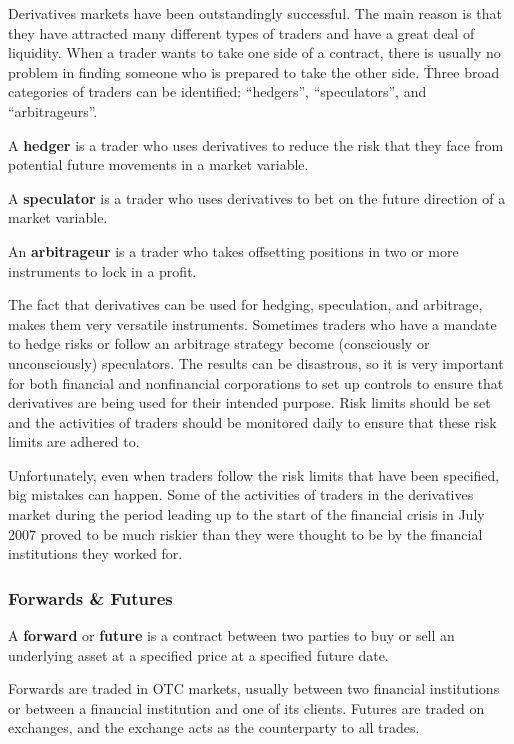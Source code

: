 Derivatives markets have been outstandingly successful. The main reason is that they have attracted many different
types of traders and have a great deal of liquidity. When a trader wants to take one side of a contract,
there is usually no problem in finding someone who is prepared to take the other side. \v

Three broad categories of traders can be identified: ``hedgers'', ``speculators'', and ``arbitrageurs''.

\bd[Hedger]
A \textbf{hedger} is a trader who uses derivatives to reduce the risk that they face from potential future movements in
a market variable.
\ed

\bd[Speculator]
A \textbf{speculator} is a trader who uses derivatives to bet on the future direction of a market variable.
\ed

\bd[Arbitrageur]
An \textbf{arbitrageur} is a trader who takes offsetting positions in two or more instruments to lock in a profit.
\ed

The fact that derivatives can be used for hedging, speculation, and arbitrage, makes them very versatile instruments.
Sometimes traders who have a mandate to hedge risks or follow an arbitrage strategy become (consciously or
unconsciously) speculators. The results can be disastrous, so it is very important for both financial and
nonfinancial corporations to set up controls to ensure that derivatives are being used for their intended purpose.
Risk limits should be set and the activities of traders should be monitored daily to ensure that these risk limits
are adhered to.

Unfortunately, even when traders follow the risk limits that have been specified, big mistakes can happen. Some of
the activities of traders in the derivatives market during the period leading up to the start of the financial crisis
in July 2007 proved to be much riskier than they were thought to be by the financial institutions they worked for.

\subsubsection{Forwards \& Futures}

A \textbf{forward} or \textbf{future} is a contract between two parties to buy or sell an underlying asset at a
specified price at a specified future date.
\ed

Forwards are traded in OTC markets, usually between two financial institutions or between a financial institution and
one of its clients. Futures are traded on exchanges, and the exchange acts as the counterparty to all trades.

